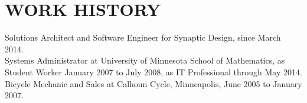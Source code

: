 
\section{WORK HISTORY}
    Solutions Architect and Software Engineer for Synaptic Design, since
    March 2014.
    \vspace{2 mm} \\
    Systems Administrator at University of Minnesota School of
    Mathematics, as Student Worker January 2007 to July 2008, as IT Professional
    through May 2014.
    \vspace{2 mm} \\
    Bicycle Mechanic and Sales at Calhoun Cycle, Minneapolis, June 2005 to
    January 2007.


